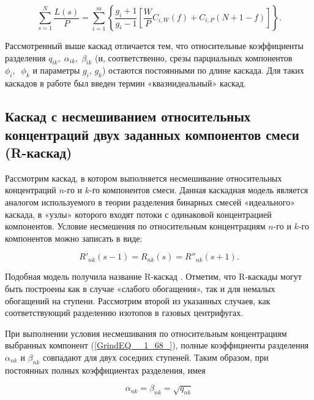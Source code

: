 \begin{equation} \label{GrindEQ__1_62_} 
  \sum _{s=1}^{N}\frac{L(s)}{P} =\sum _{i=1}^{m}\left\{\frac{g_{i} +1}{g_{i} -1} \left[\frac{W}{P} C_{i,W} (f)+C_{i,P} \left(N+1-f\right)\right]\right\}  .   
\end{equation} 
  
Рассмотренный выше каскад отличается тем, что относительные коэффициенты разделения $q_{ik} ,\; \alpha _{ik} ,\; \beta _{ik} $ (и, соответственно, срезы парциальных компонентов $\phi _{i} ,\; \; \phi _{k} $ и параметры $g_{i} $, $g_{k} $) остаются постоянными по длине каскада. Для таких каскадов в работе \cite{sazykinKvaziidealnyeKaskadyDlya2000} был введен термин «квазиидеальный» каскад.

\subsection{Каскад с несмешиванием относительных концентраций двух заданных компонентов смеси (R-каскад)}

Рассмотрим каскад, в котором выполняется несмешивание относительных концентраций $n$-го и $k$-го компонентов смеси. Данная каскадная модель является аналогом используемого в теории разделения бинарных смесей «идеального» каскада, в «узлы» которого входят потоки с одинаковой концентрацией компонентов. Условие несмешения по относительным концентрациям $n$-го и $k$-го компонентов можно записать в виде:

\begin{equation} \label{GrindEQ__1_68_} 
  R'_{nk} (s-1)=R_{nk} (s)=R''_{nk} (s+1).                                                 
\end{equation} 

Подобная модель получила название R-каскад \cite{sulaberidzeTeoriyaKaskadovDlya2011}. Отметим, что R-каскады могут быть построены как в случае «слабого обогащения», так и для немалых обогащений на ступени. Рассмотрим второй из указанных случаев, как соответствующий разделению изотопов в газовых центрифугах.

При выполнении условия несмешивания по относительным концентрациям выбранных компонент (\ref{GrindEQ__1_68_}), полные коэффициенты разделения $\alpha _{nk}$ и $\beta _{nk}$ совпадают для двух соседних ступеней. Таким образом, при постоянных полных коэффициентах разделения, имея

\begin{equation} \label{GrindEQ__1_69_} 
  \alpha _{nk} =\beta _{nk} =\sqrt{q_{nk} }  
\end{equation} 

